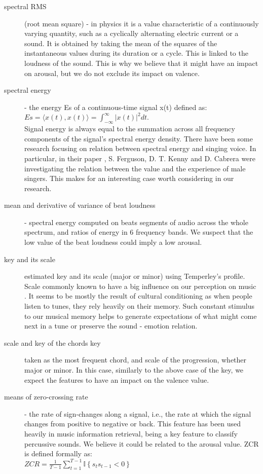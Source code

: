 \begin{description}
\item[spectral RMS] (root mean square) - in physics it is a value characteristic of a continuously varying quantity, such as a cyclically alternating electric current or a sound. It is obtained by taking the mean of the squares of the instantaneous values during its duration or a cycle. This is linked to the loudness of the sound. This is why we believe that it might have an impact on arousal, but we do not exclude its impact on valence.

\item[spectral energy] - the energy E{s} of a continuous-time signal x(t) defined as: \\
$ E{s}  =  \langle x(t), x(t)\rangle =  \int_{-\infty}^{\infty}{|x(t)|^2}dt $. \\
Signal energy is always equal to the summation across all frequency components of the signal's spectral energy density. 
There have been some research focusing on relation between spectral energy and singing voice. In particular, in their paper \cite{spectralenergy}, S. Ferguson, D. T. Kenny and D. Cabrera were investigating the relation between the value and the experience of male singers. This makes for an interesting case worth considering in our research.

\item[mean and derivative of variance of beat loudness] -  spectral energy computed on beats segments of audio across the whole spectrum, and ratios of energy in 6 frequency bands. We suspect that the low value of the beat loudness could imply a low arousal.

\item[key and its scale] estimated key and its scale (major or minor) using Temperley’s profile. Scale commonly known to have a big influence on our perception on music \cite{keys}. It seems to be mostly the result of cultural conditioning as when people listen to tunes, they rely heavily on their memory. Such constant stimulus to our musical memory helps to generate expectations of what might come next in a tune or preserve the sound - emotion relation.

\item[scale and key of the chords key] taken as the most frequent chord, and scale of the progression, whether major or minor. In this case, similarly to the above case of the key, we expect the features to have an impact on the valence value.

\item[means of zero-crossing rate] - the rate of sign-changes along a signal, i.e., the rate at which the signal changes from positive to negative or back. This feature has been used heavily in music information retrieval, being a key feature to classify percussive sounds. We believe it could be related to the arousal value.
ZCR is defined formally as: \\
$ZCR = \frac{1}{T-1} \sum_{t=1}^{T-1} {{\mathbb I}\left\{{s_t s_{t-1} < 0}\right\}}$


\end{description}
